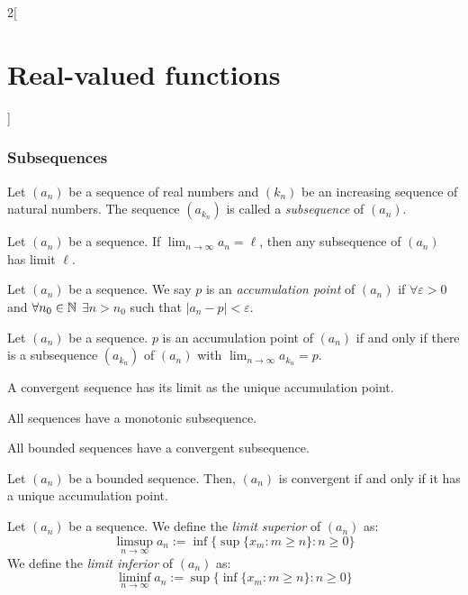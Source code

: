\documentclass[../../../main_math.tex]{subfiles}
\begin{document}
\begin{multicols}{2}[\section{Real-valued functions}]
  \subsubsection{Subsequences}
  \begin{definition}[Subsequence]
    Let $(a_n)$ be a sequence of real numbers and $(k_n)$ be an increasing sequence of natural numbers. The sequence $(a_{k_n})$ is called a \emph{subsequence} of $(a_n)$.
  \end{definition}
  \begin{lemma}
    Let $(a_n)$ be a sequence. If $\displaystyle\lim_{n\to\infty} a_n=\ell$, then any subsequence of $(a_n)$ has limit $\ell$.
  \end{lemma}
  \begin{definition}
    Let $(a_n)$ be a sequence. We say $p$ is an \emph{accumulation point} of $(a_n)$ if $\forall\varepsilon>0$ and $\forall n_0\in\mathbb{N}$ $\exists n>n_0$ such that $|a_n-p|<\varepsilon$.
  \end{definition}
  \begin{proposition}
    Let $(a_n)$ be a sequence. $p$ is an accumulation point of $(a_n)$ if and only if there is a subsequence $(a_{k_n})$ of $(a_n)$ with $\displaystyle\lim_{n\to\infty}a_{k_n}=p$.
  \end{proposition}
  \begin{corollary}
    A convergent sequence has its limit as the unique accumulation point.
  \end{corollary}
  \begin{proposition}
    All sequences have a monotonic subsequence.
  \end{proposition}
  \begin{theorem}
    All bounded sequences have a convergent subsequence.
  \end{theorem}
  \begin{proposition}
    Let $(a_n)$ be a bounded sequence. Then, $(a_n)$ is convergent if and only if it has a unique accumulation point.
  \end{proposition}
  \begin{definition}
    Let $(a_n)$ be a sequence. We define the \emph{limit superior} of $(a_n)$ as:
    $$\limsup_{n\to\infty}a_n:=\inf\{\sup\{x_m:m\geq n\}:n\geq 0\}$$
    We define the \emph{limit inferior} of $(a_n)$ as:
    $$\liminf_{n\to\infty}a_n:=\sup\{\inf\{x_m:m\geq n\}:n\geq 0\}$$
  \end{definition}
  \begin{proposition}

\end{proposition}
\end{multicols}
\end{document}

